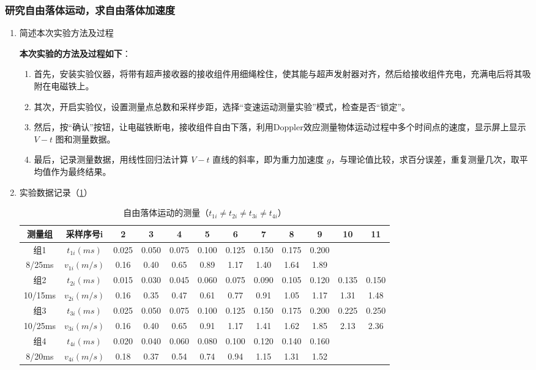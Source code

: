 \documentclass[dvipsnames, svgnames,a4paper,11pt]{article}
\begin{document}
	\subsubsection{研究自由落体运动，求自由落体加速度}
	\begin{enumerate}
		\item 简述本次实验方法及过程
		
		\textbf{本次实验的方法及过程如下}：
		
		\begin{enumerate}
			\item 首先，安装实验仪器，将带有超声接收器的接收组件用细绳栓住，使其能与超声发射器对齐，然后给接收组件充电，充满电后将其吸附在电磁铁上。
			
			\item 其次，开启实验仪，设置测量点总数和采样步距，选择“变速运动测量实验”模式，检查是否“锁定”。
			
			\item 然后，按“确认”按钮，让电磁铁断电，接收组件自由下落，利用Doppler效应测量物体运动过程中多个时间点的速度，显示屏上显示 \( V-t \) 图和测量数据。
			
			\item 最后，记录测量数据，用线性回归法计算 \( V-t \) 直线的斜率，即为重力加速度 \( g \)，与理论值比较，求百分误差，重复测量几次，取平均值作为最终结果。
		\end{enumerate}
		
		\clearpage				
		\item 实验数据记录（\cref{tab:tab2}）
		
		\begin{table}[h]
			\centering
			\caption{自由落体运动的测量（$t_{1i}≠t_{2i}≠t_{3i}≠t_{4i}$）}
			\label{tab:tab2}
			\begin{tabular}{|c|c|c|c|c|c|c|c|c|c|c|c|}
				\hline
				测量组 & 采样序号i & 2 & 3 & 4 & 5 & 6 & 7 & 8 & 9 & 10 & 11 \\
				\hline
				组1 & $t_{1i}(ms)$ & 0.025 & 0.050 & 0.075 & 0.100 & 0.125 & 0.150 & 0.175 & 0.200 & & \\
				8/25ms & $v_{1i}(m/s)$ & 0.16 & 0.40 & 0.65 & 0.89 & 1.17 & 1.40 & 1.64 & 1.89 & & \\
				\hline
				组2 & $t_{2i}(ms)$ & 0.015 & 0.030 & 0.045 & 0.060 & 0.075 & 0.090 & 0.105 & 0.120 & 0.135 & 0.150 \\
				10/15ms & $v_{2i}(m/s)$ & 0.16 & 0.35 & 0.47 & 0.61 & 0.77 & 0.91 & 1.05 & 1.17 & 1.31 & 1.48 \\
				\hline
				组3 & $t_{3i}(ms)$ & 0.025 & 0.050 & 0.075 & 0.100 & 0.125 & 0.150 & 0.175 & 0.200 & 0.225 & 0.250 \\
				10/25ms & $v_{3i}(m/s)$ & 0.16 & 0.40 & 0.65 & 0.91 & 1.17 & 1.41 & 1.62 & 1.85 & 2.13 & 2.36 \\
				\hline
				组4 & $t_{4i}(ms)$ & 0.020 & 0.040 & 0.060 & 0.080 & 0.100 & 0.120 & 0.140 & 0.160 & & \\
				8/20ms & $v_{4i}(m/s)$ & 0.18 & 0.37 & 0.54 & 0.74 & 0.94 & 1.15 & 1.31 & 1.52 & & \\
				\hline
			\end{tabular}
		\end{table}		
		

\end{enumerate}
\end{document}
